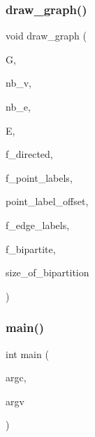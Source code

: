 \subsubsection{\texorpdfstring{draw\+\_\+graph()}{draw\_graph()}}
{\footnotesize\ttfamily void draw\+\_\+graph (\begin{DoxyParamCaption}\item[{\mbox{\hyperlink{classmp__graphics}{mp\+\_\+graphics}} \&}]{G,  }\item[{\mbox{\hyperlink{galois_8h_a09fddde158a3a20bd2dcadb609de11dc}{I\+NT}}}]{nb\+\_\+v,  }\item[{\mbox{\hyperlink{galois_8h_a09fddde158a3a20bd2dcadb609de11dc}{I\+NT}}}]{nb\+\_\+e,  }\item[{\mbox{\hyperlink{galois_8h_a09fddde158a3a20bd2dcadb609de11dc}{I\+NT}} $\ast$}]{E,  }\item[{\mbox{\hyperlink{galois_8h_a09fddde158a3a20bd2dcadb609de11dc}{I\+NT}}}]{f\+\_\+directed,  }\item[{\mbox{\hyperlink{galois_8h_a09fddde158a3a20bd2dcadb609de11dc}{I\+NT}}}]{f\+\_\+point\+\_\+labels,  }\item[{\mbox{\hyperlink{galois_8h_a09fddde158a3a20bd2dcadb609de11dc}{I\+NT}}}]{point\+\_\+label\+\_\+offset,  }\item[{\mbox{\hyperlink{galois_8h_a09fddde158a3a20bd2dcadb609de11dc}{I\+NT}}}]{f\+\_\+edge\+\_\+labels,  }\item[{\mbox{\hyperlink{galois_8h_a09fddde158a3a20bd2dcadb609de11dc}{I\+NT}}}]{f\+\_\+bipartite,  }\item[{\mbox{\hyperlink{galois_8h_a09fddde158a3a20bd2dcadb609de11dc}{I\+NT}}}]{size\+\_\+of\+\_\+bipartition }\end{DoxyParamCaption})}

\mbox{\label{draw__graph_8_c_a3c04138a5bfe5d72780bb7e82a18e627}} 
\subsubsection{\texorpdfstring{main()}{main()}}
{\footnotesize\ttfamily int main (\begin{DoxyParamCaption}\item[{int}]{argc,  }\item[{char $\ast$$\ast$}]{argv }\end{DoxyParamCaption})}

